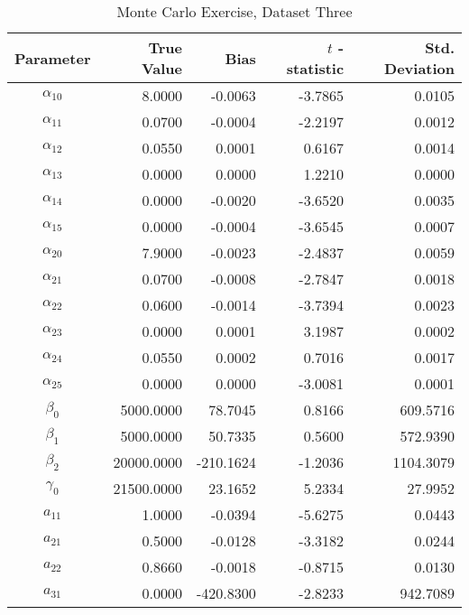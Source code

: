\begin{table}\onehalfspacing
\begin{center}
\begin{threeparttable}
  \caption{Monte Carlo Exercise, Dataset Three}
  \label{Monte Carlo: Three}
  \begin{tabular}{crrrr}\toprule

  Parameter & True Value & Bias & $t$ - statistic & Std. Deviation \\
  \midrule
  $\alpha_{10}$ &    \phantom{20000}8.0000 &   -0.0063 & -3.7865 &    0.0105 \\
  $\alpha_{11}$ &      0.0700 &   -0.0004 & -2.2197 &    0.0012 \\
  $\alpha_{12}$ &      0.0550 &    0.0001 &  0.6167 &    0.0014 \\
  $\alpha_{13}$ &      0.0000 &    0.0000 &  1.2210 &    0.0000 \\
  $\alpha_{14}$ &      0.0000 &   -0.0020 & -3.6520 &    0.0035 \\
  $\alpha_{15}$ &      0.0000 &   -0.0004 & -3.6545 &    0.0007 \\
  $\alpha_{20}$ &      7.9000 &   -0.0023 & -2.4837 &    0.0059 \\
  $\alpha_{21}$ &      0.0700 &   -0.0008 & -2.7847 &    0.0018 \\
  $\alpha_{22}$ &      0.0600 &   -0.0014 & -3.7394 &    0.0023 \\
  $\alpha_{23}$ &      0.0000 &    0.0001 &  3.1987 &    0.0002 \\
  $\alpha_{24}$ &      0.0550 &    0.0002 &  0.7016 &    0.0017 \\
  $\alpha_{25}$ &      0.0000 &    0.0000 & -3.0081 &    0.0001 \\
  $\beta_{0}$   &   5000.0000 &   78.7045 &  0.8166 &  609.5716 \\
  $\beta_{1}$   &   5000.0000 &   50.7335 &  0.5600 &  572.9390 \\
  $\beta_{2}$   &  20000.0000 & -210.1624 & -1.2036 & 1104.3079 \\
  $\gamma_{0}$  &  21500.0000 &   23.1652 &  5.2334 &   27.9952 \\
  $a_{11}$      &      1.0000 &   -0.0394 & -5.6275 &    0.0443 \\
  $a_{21}$      &      0.5000 &   -0.0128 & -3.3182 &    0.0244 \\
  $a_{22}$      &      0.8660 &   -0.0018 & -0.8715 &    0.0130 \\
  $a_{31}$      &      0.0000 & -420.8300 & -2.8233 &  942.7089 \\

\end{tabular}
\end{threeparttable}
\end{center}
\end{table}
